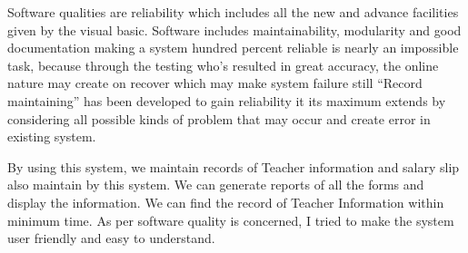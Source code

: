 \documentclass{article} %
\begin{document}
\noindent \underbar{}

\noindent \underbar{}

\noindent 

\noindent 

\noindent 

\noindent 

\noindent 

\noindent 

\noindent 

\noindent 

\noindent 

\noindent 

\noindent 

\noindent 

\noindent 

\noindent 

\noindent 

\noindent 

\noindent 

\noindent 

\noindent 

\noindent 

\noindent 

\noindent 

\noindent \textbf{                                                    }\underbar{}

\noindent \textbf{                              }\underbar{}

\noindent Software qualities are reliability which includes all the new and advance facilities given by the visual basic. Software includes maintainability, modularity and good documentation making a system hundred percent reliable is nearly an impossible task, because through the testing who's resulted in great accuracy, the online nature may create on recover which may make system failure still ``Record maintaining'' has been developed to gain reliability it its maximum extends by considering all possible kinds of problem that may occur and create error in existing system. 

\noindent               By using this system, we maintain records of Teacher information and salary slip also maintain by this system. We can generate reports of all the forms and display the information. We can find the record of Teacher Information within minimum time. As per software quality is concerned, I tried to make the system user friendly and easy to understand.

\noindent 
\end{document}
